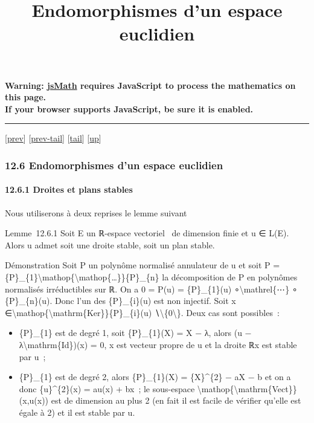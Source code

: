 \documentclass[]{article}
\title{Endomorphismes d'un espace euclidien}
\author{}
\date{}
\begin{document}
\maketitle

\textbf{Warning: \href{http://www.math.union.edu/locate/jsMath}{jsMath}
requires JavaScript to process the mathematics on this page.\\ If your
browser supports JavaScript, be sure it is enabled.}

\begin{center}\rule{3in}{0.4pt}\end{center}

{[}\href{coursse71.html}{prev}{]}
{[}\href{coursse71.html\#tailcoursse71.html}{prev-tail}{]}
{[}\hyperref[tailcoursse72.html]{tail}{]}
{[}\href{coursch13.html\#coursse72.html}{up}{]}

\subsubsection{12.6 Endomorphismes d'un espace euclidien}

\paragraph{12.6.1 Droites et plans stables}

Nous utiliserons à deux reprises le lemme suivant

Lemme~12.6.1 Soit E un ℝ-espace vectoriel ~de dimension finie et u ∈
L(E). Alors u admet soit une droite stable, soit un plan stable.

Démonstration Soit P un polynôme normalisé annulateur de u et soit P =
\{P\}\_\{1\}\textbackslash{}mathop\{\textbackslash{}mathop\{\ldots{}\}\}\{P\}\_\{n\}
la décomposition de P en polynômes normalisés irréductibles sur ℝ. On a
0 = P(u) = \{P\}\_\{1\}(u) ∘\textbackslash{}mathrel\{⋯\} ∘
\{P\}\_\{n\}(u). Donc l'un des \{P\}\_\{i\}(u) est non injectif. Soit x
∈\textbackslash{}mathop\{\textbackslash{}mathrm\{Ker\}\}\{P\}\_\{i\}(u)
∖\textbackslash{}\{0\textbackslash{}\}. Deux cas sont possibles~:

\begin{itemize}
\itemsep1pt\parskip0pt
\item
  \{P\}\_\{1\} est de degré 1, soit \{P\}\_\{1\}(X) = X − λ, alors (u −
  λ\textbackslash{}mathrm\{Id\})(x) = 0, x est vecteur propre de u et la
  droite ℝx est stable par u~;
\item
  \{P\}\_\{1\} est de degré 2, alors \{P\}\_\{1\}(X) = \{X\}\^{}\{2\} −
  aX − b et on a donc \{u\}\^{}\{2\}(x) = au(x) + bx~; le sous-espace
  \textbackslash{}mathop\{\textbackslash{}mathrm\{Vect\}\}(x,u(x)) est
  de dimension au plus 2 (en fait il est facile de vérifier qu'elle est
  égale à 2) et il est stable par u.
\end{itemize}
\end{document}

